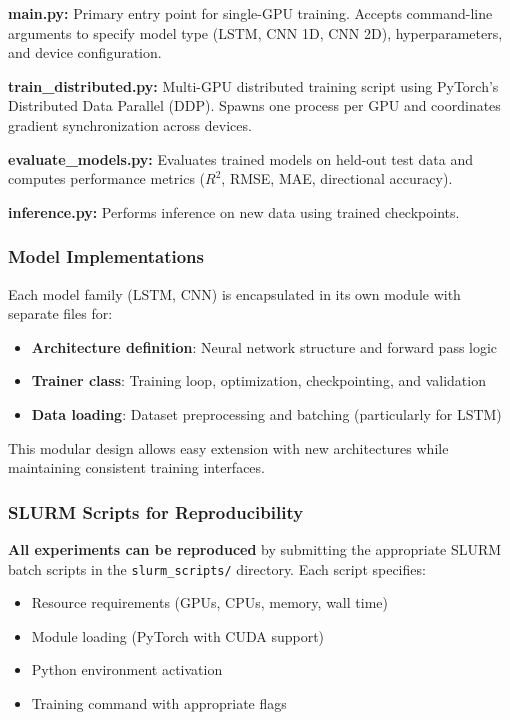 \documentclass[sigconf]{acmart}
\begin{document}
\textbf{main.py:} Primary entry point for single-GPU training. Accepts command-line arguments to specify model type (LSTM, CNN 1D, CNN 2D), hyperparameters, and device configuration.

\textbf{train\_distributed.py:} Multi-GPU distributed training script using PyTorch's Distributed Data Parallel (DDP). Spawns one process per GPU and coordinates gradient synchronization across devices.

\textbf{evaluate\_models.py:} Evaluates trained models on held-out test data and computes performance metrics ($R^2$, RMSE, MAE, directional accuracy).

\textbf{inference.py:} Performs inference on new data using trained checkpoints.

\subsubsection{Model Implementations}

Each model family (LSTM, CNN) is encapsulated in its own module with separate files for:
\begin{itemize}
  \item \textbf{Architecture definition}: Neural network structure and forward pass logic
  \item \textbf{Trainer class}: Training loop, optimization, checkpointing, and validation
  \item \textbf{Data loading}: Dataset preprocessing and batching (particularly for LSTM)
\end{itemize}

This modular design allows easy extension with new architectures while maintaining consistent training interfaces.

\subsubsection{SLURM Scripts for Reproducibility}

\textbf{All experiments can be reproduced} by submitting the appropriate SLURM batch scripts in the \texttt{slurm\_scripts/} directory. Each script specifies:
\begin{itemize}
  \item Resource requirements (GPUs, CPUs, memory, wall time)
  \item Module loading (PyTorch with CUDA support)
  \item Python environment activation
  \item Training command with appropriate flags
\end{itemize}
\end{document}
